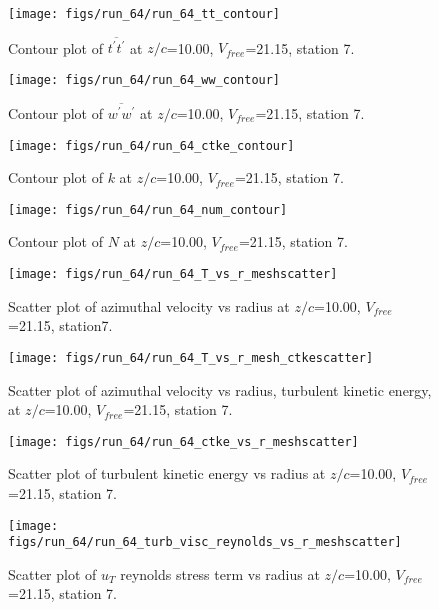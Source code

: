 \begin{figure}[H]
\centering
\texttt{[image: figs/run\_64/run\_64\_tt\_contour]}
\caption{Contour plot of $\overline{t^\prime t^\prime}$ at $z/c$=10.00, $V_{free}$=21.15, station 7.}
\end{figure}


\begin{figure}[H]
\centering
\texttt{[image: figs/run\_64/run\_64\_ww\_contour]}
\caption{Contour plot of $\overline{w^\prime w^\prime}$ at $z/c$=10.00, $V_{free}$=21.15, station 7.}
\end{figure}


\begin{figure}[H]
\centering
\texttt{[image: figs/run\_64/run\_64\_ctke\_contour]}
\caption{Contour plot of $k$ at $z/c$=10.00, $V_{free}$=21.15, station 7.}
\end{figure}


\begin{figure}[H]
\centering
\texttt{[image: figs/run\_64/run\_64\_num\_contour]}
\caption{Contour plot of $N$ at $z/c$=10.00, $V_{free}$=21.15, station 7.}
\end{figure}


\begin{figure}[H]
\centering
\texttt{[image: figs/run\_64/run\_64\_T\_vs\_r\_meshscatter]}
\caption{Scatter plot of azimuthal velocity vs radius at $z/c$=10.00, $V_{free}$=21.15, station7.}
\end{figure}


\begin{figure}[H]
\centering
\texttt{[image: figs/run\_64/run\_64\_T\_vs\_r\_mesh\_ctkescatter]}
\caption{Scatter plot of azimuthal velocity vs radius, turbulent kinetic energy, at $z/c$=10.00, $V_{free}$=21.15, station 7.}
\end{figure}


\begin{figure}[H]
\centering
\texttt{[image: figs/run\_64/run\_64\_ctke\_vs\_r\_meshscatter]}
\caption{Scatter plot of turbulent kinetic energy vs radius at $z/c$=10.00, $V_{free}$=21.15, station 7.}
\end{figure}


\begin{figure}[H]
\centering
\texttt{[image: figs/run\_64/run\_64\_turb\_visc\_reynolds\_vs\_r\_meshscatter]}
\caption{Scatter plot of $
u_T$ reynolds stress term vs radius at $z/c$=10.00, $V_{free}$=21.15, station 7.}
\end{figure}


